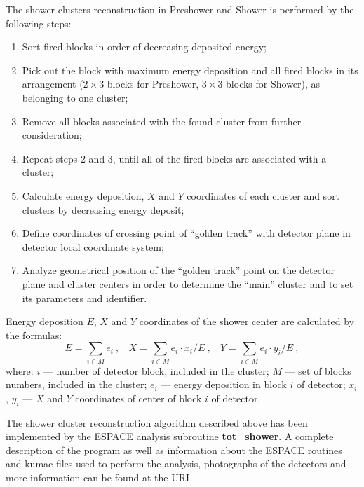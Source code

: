 The shower clusters reconstruction in Preshower and Shower is performed by the 
following steps:
\begin{enumerate}
\item Sort fired blocks in order of decreasing deposited energy; 
\item Pick out the block with maximum energy deposition and all fired blocks in
      its arrangement ($2 \times 3$ blocks for Preshower, $3 \times 3$ blocks 
      for Shower), as belonging to one cluster;
\item Remove all blocks associated with the found cluster from further 
      consideration;
\item Repeat steps 2 and 3, until all of the fired blocks are associated with 
      a cluster;
\item Calculate energy deposition, $X$ and $Y$ coordinates of each cluster and 
      sort clusters by decreasing energy deposit;
\item Define coordinates of crossing point of ``golden track'' with detector 
      plane in detector local coordinate system;
\item Analyze geometrical position of the ``golden track'' point on the 
      detector plane and cluster centers in order to determine the ``main'' 
      cluster and to set its parameters and identifier.
\end{enumerate}

Energy deposition $E$, $X$ and $Y$ coordinates of the shower center are 
calculated by the formulas: 
$$E=\sum_{i \in M}e_i\ ,\ \ \ \ 
X=\sum_{i \in M}e_i \cdot x_i/E\ ,\ \ \ \ Y=\sum_{i \in M}e_i \cdot y_i/E\ ,$$
where: $i$ --- number of detector block, included in the cluster; $M$ --- set
of blocks numbers, included in the cluster; $e_i$ --- energy deposition in 
block $i$ of detector; $x_i$, $y_i$ --- $X$ and $Y$ coordinates of center 
of block $i$ of detector.

The shower cluster reconstruction algorithm described above has been 
implemented  by the ESPACE analysis subroutine {\bf tot\_shower}.  A complete 
description of the program as well as information about the ESPACE routines 
and kumac files 
used to perform the analysis, photographs of the detectors and more 
information can be found at the URL 

